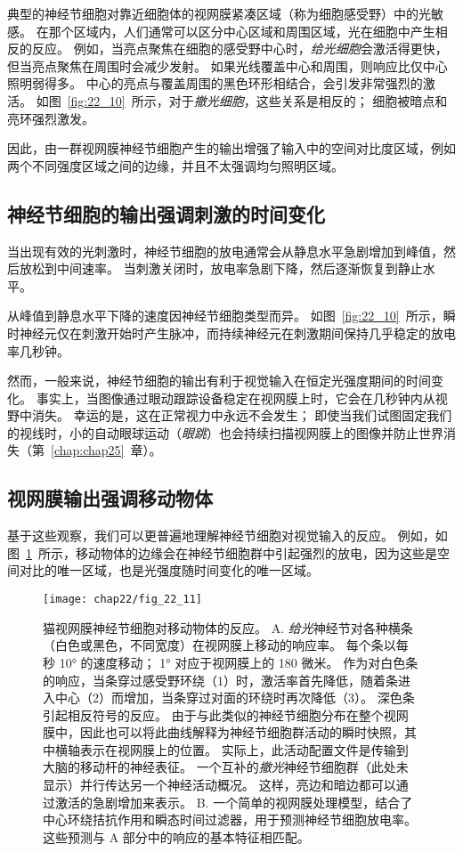 典型的神经节细胞对靠近细胞体的视网膜紧凑区域（称为细胞感受野）中的光敏感。
在那个区域内，人们通常可以区分中心区域和周围区域，光在细胞中产生相反的反应。
例如，当亮点聚焦在细胞的感受野中心时，\textit{给光细胞}会激活得更快，但当亮点聚焦在周围时会减少发射。
如果光线覆盖中心和周围，则响应比仅中心照明弱得多。 
中心的亮点与覆盖周围的黑色环形相结合，会引发非常强烈的激活。
如图~\ref{fig:22_10}~所示，对于\textit{撤光细胞}，这些关系是相反的；
细胞被暗点和亮环强烈激发。



因此，由一群视网膜神经节细胞产生的输出增强了输入中的空间对比度区域，例如两个不同强度区域之间的边缘，并且不太强调均匀照明区域。



\subsection{神经节细胞的输出强调刺激的时间变化}

当出现有效的光刺激时，神经节细胞的放电通常会从静息水平急剧增加到峰值，然后放松到中间速率。
当刺激关闭时，放电率急剧下降，然后逐渐恢复到静止水平。


从峰值到静息水平下降的速度因神经节细胞类型而异。
如图~\ref{fig:22_10}~所示，瞬时神经元仅在刺激开始时产生脉冲，而持续神经元在刺激期间保持几乎稳定的放电率几秒钟。


然而，一般来说，神经节细胞的输出有利于视觉输入在恒定光强度期间的时间变化。
事实上，当图像通过眼动跟踪设备稳定在视网膜上时，它会在几秒钟内从视野中消失。
幸运的是，这在正常视力中永远不会发生；
即使当我们试图固定我们的视线时，小的自动眼球运动（\textit{眼跳}）也会持续扫描视网膜上的图像并防止世界消失（第~\ref{chap:chap25}~章）。



\subsection{视网膜输出强调移动物体}

基于这些观察，我们可以更普遍地理解神经节细胞对视觉输入的反应。
例如，如图~\ref{fig:22_11}~所示，移动物体的边缘会在神经节细胞群中引起强烈的放电，因为这些是空间对比的唯一区域，也是光强度随时间变化的唯一区域。


\begin{figure}[htbp]
	\centering
	\texttt{[image: chap22/fig\_22\_11]}
	\caption{猫视网膜神经节细胞对移动物体的反应。 
		A. \textit{给光}神经节对各种横条（白色或黑色，不同宽度）在视网膜上移动的响应率。 
		每个条以每秒 10° 的速度移动； 1° 对应于视网膜上的 180 微米。
		作为对白色条的响应，当条穿过感受野环绕（1）时，激活率首先降低，随着条进入中心（2）而增加，当条穿过对面的环绕时再次降低（3）。
		深色条引起相反符号的反应。 
		由于与此类似的神经节细胞分布在整个视网膜中，因此也可以将此曲线解释为神经节细胞群活动的瞬时快照，其中横轴表示在视网膜上的位置。 
		实际上，此活动配置文件是传输到大脑的移动杆的神经表征。 
		一个互补的\textit{撤光}神经节细胞群（此处未显示）并行传达另一个神经活动概况。 这样，亮边和暗边都可以通过激活的急剧增加来表示。 
		B. 一个简单的视网膜处理模型，结合了中心环绕拮抗作用和瞬态时间过滤器，用于预测神经节细胞放电率。 
		这些预测与 A 部分中的响应的基本特征相匹配。}
	\label{fig:22_11}
\end{figure}


